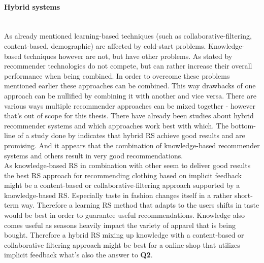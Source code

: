 \paragraph{Hybrid systems}\hfill\\
As already mentioned learning-based techniques (such as collaborative-filtering, content-based, demographic) are affected by cold-start problems.
Knowledge-based techniques however are not, but have other problems.
As stated by \citeauthor{herlocker:2000} recommender technologies do not compete, but can rather increase their overall performance when being combined.\citep[p.~241]{herlocker:2000}
In order to overcome these problems mentioned earlier these approaches can be combined.
This way drawbacks of one approach can be nullified by combining it with another and vice versa.
There are various ways multiple recommender approaches can be mixed together - however that's out of scope for this thesis.
\citep[p.~378-380]{burke:2007}
There have already been studies about hybrid recommender systems and which approaches work best with which.
The bottom-line of a study done by \citeauthor{burke:2007} indicates that hybrid RS achieve good results and are promising.
And it appears that the combination of knowledge-based recommender systems and others result in very good recommendations.
\citep[p.~405-406]{burke:2007}
\\

\noindent
As knowledge-based RS in combination with other seem to deliver good results the best RS approach for recommending clothing based on implicit feedback might be a content-based or collaborative-filtering approach supported by a knowledge-based RS.
Especially taste in fashion changes itself in a rather short-term way.
Therefore a learning RS method that adapts to the users shifts in taste would be best in order to guarantee useful recommendations.
Knowledge also comes useful as seasons heavily impact the variety of apparel that is being bought.
Therefore a hybrid RS mixing up knowledge with a content-based or collaborative filtering approach might be best for a online-shop that utilizes implicit feedback what's also the answer to \textbf{Q2}.

